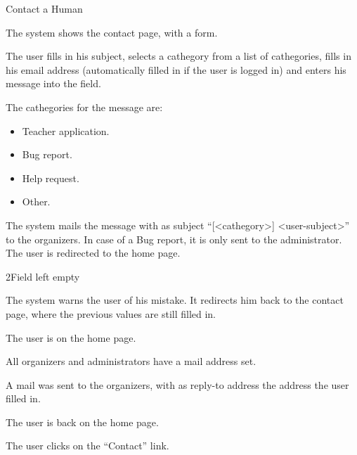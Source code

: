 
\begin{uc}{Contact a Human}

    \begin{uc-mss}
    \item The system shows the contact page, with a form.
    \item The user fills in his subject, selects a cathegory from a list of
        cathegories, fills in his email address (automatically filled in if the
        user is logged in) and enters his message into the field.

        The cathegories for the message are:
        \begin{itemize}
        \item Teacher application.
        \item Bug report.
        \item Help request.
        \item Other.
        \end{itemize}
    \item The system mails the message with as subject ``[<cathegory>]
        <user-subject>'' to the organizers. In case of a Bug report, it is only
        sent to the administrator. The user is redirected to the home page.
    \end{uc-mss}

    \begin{uc-ext}

        \begin{uc-fail}{2}{Field left empty}
        \item The system warns the user of his mistake. It redirects him back to
            the contact page, where the previous values are still filled in.
        \end{uc-fail}

    \end{uc-ext}

    \begin{uc-pre}
    \item The user is on the home page.
    \item All organizers and administrators have a mail address set.
    \end{uc-pre}

    \begin{uc-post}
    \item A mail was sent to the organizers, with as reply-to address the
        address the user filled in.
    \item The user is back on the home page.
    \end{uc-post}

    \begin{uc-trig}
        The user clicks on the ``Contact'' link.
    \end{uc-trig}

\end{uc}

